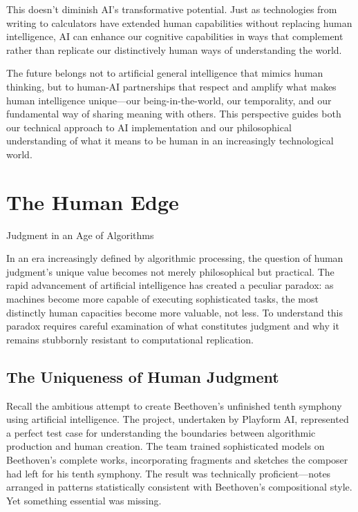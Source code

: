 \documentclass[
  Letterpaper,
]{scrbook}
\begin{document}
This doesn't diminish AI's transformative potential. Just as
technologies from writing to calculators have extended human
capabilities without replacing human intelligence, AI can enhance our
cognitive capabilities in ways that complement rather than replicate our
distinctively human ways of understanding the world.

The future belongs not to artificial general intelligence that mimics
human thinking, but to human-AI partnerships that respect and amplify
what makes human intelligence unique---our being-in-the-world, our
temporality, and our fundamental way of sharing meaning with others.
This perspective guides both our technical approach to AI implementation
and our philosophical understanding of what it means to be human in an
increasingly technological world.


\chapter{The Human Edge}\label{the-human-edge}

Judgment in an Age of Algorithms

In an era increasingly defined by algorithmic processing, the question
of human judgment's unique value becomes not merely philosophical but
practical. The rapid advancement of artificial intelligence has created
a peculiar paradox: as machines become more capable of executing
sophisticated tasks, the most distinctly human capacities become more
valuable, not less. To understand this paradox requires careful
examination of what constitutes judgment and why it remains stubbornly
resistant to computational replication.

\section{The Uniqueness of Human
Judgment}\label{the-uniqueness-of-human-judgment}

Recall the ambitious attempt to create Beethoven's unfinished tenth
symphony using artificial intelligence. The project, undertaken by
Playform AI, represented a perfect test case for understanding the
boundaries between algorithmic production and human creation. The team
trained sophisticated models on Beethoven's complete works,
incorporating fragments and sketches the composer had left for his tenth
symphony. The result was technically proficient---notes arranged in
patterns statistically consistent with Beethoven's compositional style.
Yet something essential was missing.
\end{document}
